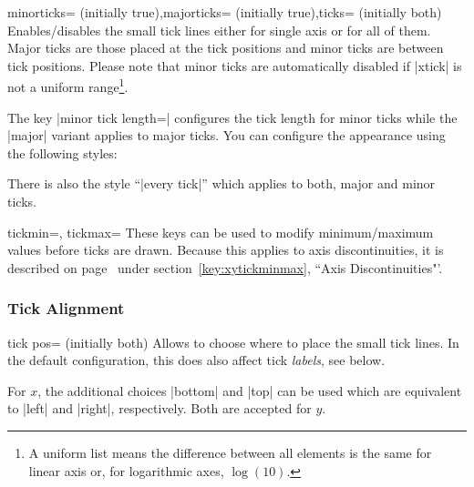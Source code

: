 \begin{pgfplotsxykeylist}{\x minorticks= (initially true),\x majorticks= (initially true),ticks= (initially both)}
Enables/disables the small tick lines either for single axis or for all of them. Major ticks are those placed at the tick positions and minor ticks are between tick positions. Please note that minor ticks are automatically disabled if |xtick| is not a uniform range\footnote{A uniform list means the difference between all elements is the same for linear axis or, for logarithmic axes, $\log(10)$.}.

The key |minor tick length=| configures the tick length for minor ticks while the |major| variant applies to major ticks.
You can configure the appearance using the following styles:
\begin{codeexample}
\end{codeexample}
There is also the style ``|every tick|'' which applies to both, major and minor ticks.
\end{pgfplotsxykeylist}

\begin{pgfplotsxykeylist}{\x tickmin=, \x tickmax=}
	These keys can be used to modify minimum/maximum values before ticks are drawn. Because this applies to axis discontinuities, it is described on page~\pageref{key:xytickminmax} under section~\ref{key:xytickminmax}, ``Axis Discontinuities"'.
\end{pgfplotsxykeylist}

\subsubsection{Tick Alignment}

\begin{pgfplotsxykey}{\x tick pos= (initially both)}
Allows to choose where to place the small tick lines. In the default configuration, this does also affect tick \emph{labels}, see below.

For $x$, the additional choices |bottom| and |top| can be used which are equivalent to |left| and |right|, respectively. Both are accepted for $y$.
\end{pgfplotsxykey}

